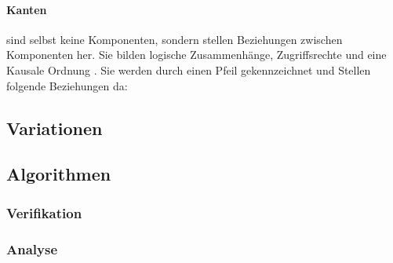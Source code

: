 \paragraph{Kanten} sind selbst keine Komponenten, sondern stellen Beziehungen zwischen Komponenten her.
Sie bilden logische Zusammenhänge, Zugriffsrechte und eine Kausale Ordnung .
Sie werden durch einen Pfeil gekennzeichnet und Stellen folgende Beziehungen da:
\begin{center}
\end{center}


\subsection{Variationen}

\subsection{Algorithmen}

\subsubsection{Verifikation}

\subsubsection{Analyse}


